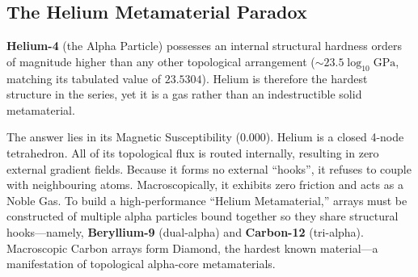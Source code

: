 \subsection*{The Helium Metamaterial Paradox}
\textbf{Helium-4} (the Alpha Particle) possesses an internal structural hardness orders of magnitude higher than any other topological arrangement ($\sim 23.5 \log_{10} \text{GPa}$, matching its tabulated value of $23.5304$). Helium is therefore the hardest structure in the series, yet it is a gas rather than an indestructible solid metamaterial.

The answer lies in its Magnetic Susceptibility ($0.000$). Helium is a closed 4-node tetrahedron. All of its topological flux is routed internally, resulting in zero external gradient fields. Because it forms no external ``hooks'', it refuses to couple with neighbouring atoms. Macroscopically, it exhibits zero friction and acts as a Noble Gas.
To build a high-performance ``Helium Metamaterial,'' arrays must be constructed of multiple alpha particles bound together so they share structural hooks---namely, \textbf{Beryllium-9} (dual-alpha) and \textbf{Carbon-12} (tri-alpha). Macroscopic Carbon arrays form Diamond, the hardest known material---a manifestation of topological alpha-core metamaterials.

